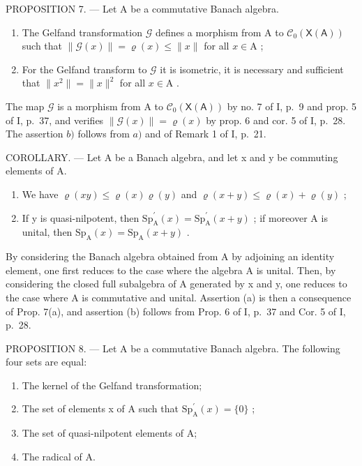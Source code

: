 PROPOSITION 7. --- Let A be a commutative Banach algebra.

\begin{enumerate}
\def\labelenumi{\alph{enumi})}
\item
  The Gelfand transformation \(\mathcal{G}\) defines a morphism from A to \(\mathcal{C}_0(\mathsf{X}(\mathsf{A}))\) such that \(\| \mathcal{G}(x)\| = \varrho (x)\leqslant \| x\|\) for all \(x\in \mathrm{A}\) ;
\item
  For the Gelfand transform to \(\mathcal{G}\) it is isometric, it is necessary and sufficient that \(\|x^{2}\|=\|x\|^{2}\) for all \(x\in\mathrm{A}\) .
\end{enumerate}

The map \(\mathcal{G}\) is a morphism from A to \(\mathcal{C}_0(\mathsf{X}(\mathsf{A}))\) by no. 7 of I, p.~9 and prop. 5 of I, p.~37, and verifies \(\| \mathcal{G}(x)\| = \varrho (x)\) by prop. 6 and cor. 5 of I, p.~28. The assertion \(b)\) follows from \(a)\) and of Remark 1 of I, p.~21.

COROLLARY. --- Let A be a Banach algebra, and let x and y be commuting elements of A.

\begin{enumerate}
\def\labelenumi{\alph{enumi})}
\item
  We have \(\varrho(xy) \leqslant \varrho(x)\varrho(y)\) and \(\varrho(x + y) \leqslant \varrho(x) + \varrho(y)\) ;
\item
  If y is quasi-nilpotent, then \(\mathrm{Sp}_{\mathrm{A}}^{\prime}(x)=\mathrm{Sp}_{\mathrm{A}}^{\prime}(x+y)\) ; if moreover A is unital, then \(\mathrm{Sp}_{\mathrm{A}}(x)=\mathrm{Sp}_{\mathrm{A}}(x+y)\) .
\end{enumerate}

By considering the Banach algebra obtained from A by adjoining an identity element, one first reduces to the case where the algebra A is unital. Then, by considering the closed full subalgebra of A generated by x and y, one reduces to the case where A is commutative and unital. Assertion (a) is then a consequence of Prop. 7(a), and assertion (b) follows from Prop. 6 of I, p.~37 and Cor. 5 of I, p.~28.

PROPOSITION 8. --- Let A be a commutative Banach algebra. The following four sets are equal:

\begin{enumerate}
\def\labelenumi{(\roman{enumi})}
\item
  The kernel of the Gelfand transformation;
\item
  The set of elements x of A such that \(\mathrm{Sp}_{\mathrm{A}}^{\prime}(x)=\{0\}\) ;
\item
  The set of quasi-nilpotent elements of A;
\item
  The radical of A.
\end{enumerate}

